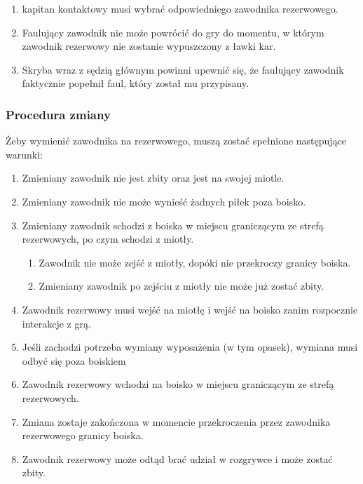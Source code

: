 \documentclass[12pt]{article}
\begin{document}
\begin{enumerate}
\begin{enumerate}
		            \begin{enumerate}
			            \item
			                  kapitan kontaktowy musi wybrać odpowiedniego zawodnika
			                  rezerwowego.
			            \item
			                  Faulujący zawodnik nie może powrócić do gry do momentu, w którym
			                  zawodnik rezerwowy nie zostanie wypuszczony z ławki kar.
			            \item
			                  Skryba wraz z sędzią głównym powinni upewnić się, że faulujący
			                  zawodnik faktycznie popełnił faul, który został mu przypisany.
		            \end{enumerate}
	      \end{enumerate}
\end{enumerate}

\subsubsection{Procedura zmiany}

Żeby wymienić zawodnika na rezerwowego, muszą zostać spełnione
następujące warunki:

\begin{enumerate}
	\item
	      Zmieniany zawodnik nie jest zbity oraz jest na swojej miotle.
	\item
	      Zmieniany zawodnik nie może wynieść żadnych piłek poza boisko.
	\item
	      Zmieniany zawodnik schodzi z boiska w miejscu graniczącym ze strefą
	      rezerwowych, po czym schodzi z miotły.

	      \begin{enumerate}
		      \item
		            Zawodnik nie może zejść z miotły, dopóki nie przekroczy granicy
		            boiska.
		      \item
		            Zmieniany zawodnik po zejściu z miotły nie może już zostać zbity.
	      \end{enumerate}
	\item
	      Zawodnik rezerwowy musi wejść na miotłę i wejść na boisko zanim
	      rozpocznie interakcje z grą.
	\item
	      Jeśli zachodzi potrzeba wymiany wyposażenia (w tym opasek), wymiana
	      musi odbyć się poza boiskiem
	\item
	      Zawodnik rezerwowy wchodzi na boisko w miejscu graniczącym ze strefą
	      rezerwowych.
	\item
	      Zmiana zostaje zakończona w momencie przekroczenia przez zawodnika
	      rezerwowego granicy boiska.
	\item
	      Zawodnik rezerwowy może odtąd brać udział w rozgrywce i może zostać
	      zbity.
\end{enumerate}
\end{document}
